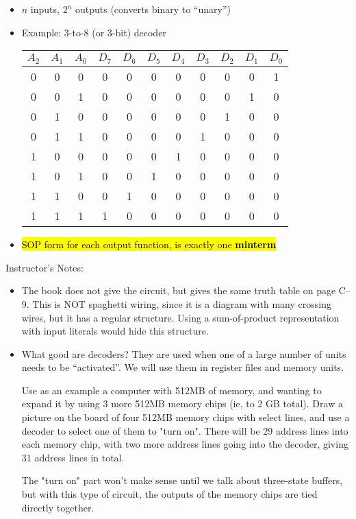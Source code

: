 \begin{frame}[fragile]
\begin{itemize}
	\item $n$ inputs, $2^n$ outputs (converts binary to ``unary'')
	\item Example: 3-to-8 (or 3-bit) decoder
		\begin{center}
		\begin{tabular}{ccc|cccccccc}
		$A_2$ & $A_1$ & $A_0$ & $D_7$ & $D_6$ & $D_5$ & $D_4$ & $D_3$ & $D_2$ & $D_1$ & $D_0$\\\hline
		0 & 0 & 0 & 0 & 0 & 0 & 0 & 0 & 0 & 0 &1\\
		0 & 0 & 1 & 0 & 0 & 0 & 0 & 0 & 0 & 1 &0\\
		0 & 1 & 0 & 0 & 0 & 0 & 0 & 0 & 1 & 0 &0\\
		0 & 1 & 1 & 0 & 0 & 0 & 0 & 1 & 0 & 0 &0\\
		1 & 0 & 0 & 0 & 0 & 0 & 1 & 0 & 0 & 0 &0\\
		1 & 0 & 1 & 0 & 0 & 1 & 0 & 0 & 0 & 0 &0\\
		1 & 1 & 0 & 0 & 1 & 0 & 0 & 0 & 0 & 0 &0\\
		1 & 1 & 1 & 1 & 0 & 0 & 0 & 0 & 0 & 0 &0\\
		\end{tabular}
		\end{center}
  \item \hl{SOP form for each output function, is exactly one \textbf{minterm}}
\end{itemize}
\end{frame}
\BNotes\ifnum{}
\begin{frame}[fragile]
Instructor's Notes:
\begin{itemize}
\item
	The book does not give the circuit, but gives the same truth table on
	page C--9. This is NOT spaghetti wiring, since it is a
	diagram with many crossing wires, but it has a regular
	structure. Using a sum-of-product representation with input literals
	would hide this structure.
\item 
	What good are decoders? They are used when one of a large number of
	units needs to be ``activated''. We will use them in register files
	and memory units.

	Use as an example a computer with 512MB of memory, and wanting
	to expand it by using 3 more 512MB memory chips (ie, to 2 GB total).
	Draw a picture on the board of four 512MB memory chips with select 
	lines, and use a decoder to select one of them to "turn on".  There
	will be 29 address lines into each memory chip, with two more 
	address lines going into the decoder, giving 31 address lines in
	total.

	The "turn on" part won't make sense until we talk about three-state
	buffers, but with this type of circuit, the outputs of the memory
	chips are tied directly together.
\end{itemize}
\end{frame}
\fi\ENotes


